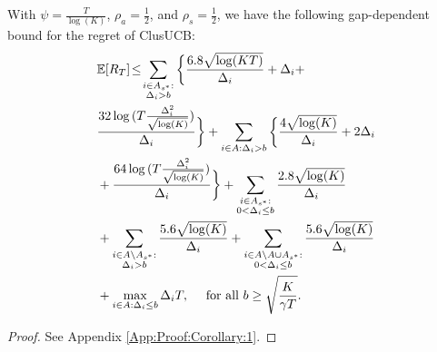 \begin{corollary}
\label{Result:Corollary:1}
With $\psi=\frac{T}{\log (K)}$, $\rho_{a}=\frac{1}{2}$, and $\rho_{s}=\frac{1}{2}$,  we have the following gap-dependent bound for the regret of ClusUCB:
\begin{align*}
&\mathbb{E} [R_T] \!\le\! 
\sum_{\substack{i\in A_{s^{*}}:\\\Delta_{i} > b}}\bigg\lbrace \frac{6.8\sqrt{\log (KT)}}{\Delta_{i}} + \Delta_{i} + \\
& \frac{32\log{(T\frac{\Delta_{i}^{2}}{\sqrt{\log (K)}})}}{\Delta_{i}} \bigg\rbrace + \sum_{i\in A:\Delta_{i} > b}\bigg\lbrace\frac{4\sqrt{\log (K)}}{\Delta_{i}} + 2\Delta_{i} \\
& + \frac{64\log{(T\frac{\Delta_{i}^{2}}{\sqrt{\log (K)}})}}{\Delta_{i}}\bigg\rbrace
	  + \sum\limits_{\substack{i\in A_{s^{*}}:\\0< \Delta_{i} \leq b}}\frac{2.8\sqrt{\log (K)}}{\Delta_{i}}\\
	& + \sum\limits_{\substack{i\in A\setminus A_{s^{*}}:\\\Delta_{i} > b}}\frac{5.6\sqrt{\log (K)}}{\Delta_{i}} + \sum\limits_{\substack{i\in A\setminus A \cup A_{s^{*}}:\\0 < \Delta_{i}\leq b}}\frac{5.6\sqrt{\log (K)}}{\Delta_{i}} \\
	& + \max\limits_{i\in A:\Delta_{i}\leq b}\Delta_{i}T, \quad \text{ for all }b\geq \sqrt{\frac{K}{\gamma T}}.
	\end{align*} 
\end{corollary}
\begin{proof}
 See Appendix \ref{App:Proof:Corollary:1}.
\end{proof}

